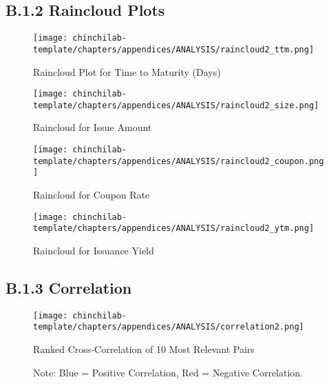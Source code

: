\newpage

\subsection{B.1.2 Raincloud Plots}

\begin{figure}[h!]
    \centering
    \texttt{[image: chinchilab-template/chapters/appendices/ANALYSIS/raincloud2\_ttm.png]}
    \caption{Raincloud Plot for Time to Maturity (Days)}
    \label{fig:my_label}
\end{figure}

\begin{figure}[h!]
    \centering
    \texttt{[image: chinchilab-template/chapters/appendices/ANALYSIS/raincloud2\_size.png]}
    \caption{Raincloud for Issue Amount}
    \label{fig:my_label}
\end{figure}

\begin{figure}[h!]
    \centering
    \texttt{[image: chinchilab-template/chapters/appendices/ANALYSIS/raincloud2\_coupon.png]}
    \caption{Raincloud for Coupon Rate}
    \label{fig:my_label}
\end{figure}

\begin{figure}[h!]
    \centering
    \texttt{[image: chinchilab-template/chapters/appendices/ANALYSIS/raincloud2\_ytm.png]}
    \caption{Raincloud for Issuance Yield}
    \label{fig:my_label}
\end{figure}

\newpage

\subsection{B.1.3 Correlation}

\begin{figure}[h!]
    \centering
    \texttt{[image: chinchilab-template/chapters/appendices/ANALYSIS/correlation2.png]}
    \caption{Ranked Cross-Correlation of 10 Most Relevant Pairs}
    \caption*{Note: Blue = Positive Correlation, Red = Negative Correlation.}
    \label{fig:my_label}
\end{figure}

